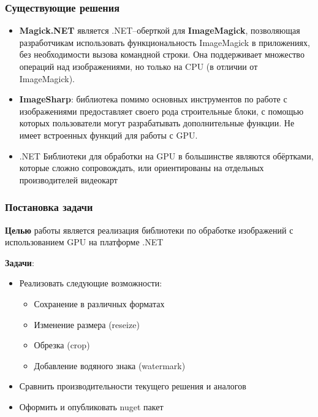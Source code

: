 \documentclass[aspectratio=169]{beamer}
\begin{document}
\begin{frame}  
  \frametitle{Существующие решения}
    \begin{itemize}
    
        \item \textbf{Magick.NET} является .NET--оберткой для \textbf{ImageMagick}, позволяющая разработчикам использовать функциональность ImageMagick в приложениях, без необходимости вызова командной строки. Она поддерживает множество операций над изображениями, но только на CPU (в отличии от ImageMagick).
    
        \item \textbf{ImageSharp}: библиотека помимо основных инструментов по работе с изображениями предоставляет своего рода строительные блоки, с помощью которых пользователи могут разрабатывать дополнительные функции. Не имеет встроенных функций для работы с GPU.

        \item .NET Библиотеки для обработки на GPU в большинстве являются обёртками, которые сложно сопровождать, или ориентированы на отдельных производителей видеокарт
    \end{itemize}
    
\end{frame}

\begin{frame}
  \frametitle{Постановка задачи}
  \textbf{Целью} работы является реализация библиотеки по обработке изображений с использованием GPU на платформе .NET %
  
  \textbf{Задачи}:
  \begin{itemize}
    \item Реализовать следующие возможности:
    \begin{itemize}
        \item Сохранение в различных форматах
        \item Изменение размера (reseize)
        \item Обрезка (crop)
        \item Добавление водяного знака (watermark)
    \end{itemize}
    \item Сравнить производительности текущего решения и аналогов 
    \item Оформить и опубликовать nuget пакет
  \end{itemize}
\end{frame}
            
\end{document}
